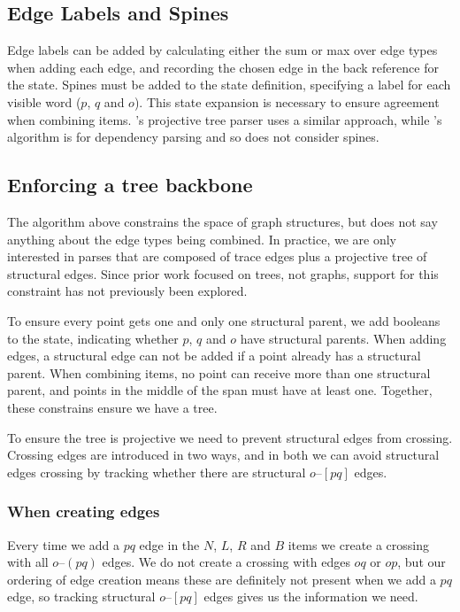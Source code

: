 \subsection{Edge Labels and Spines}\label{sec:labels}
Edge labels can be added by calculating either the sum or max over edge types when adding each edge, and recording the chosen edge in the back reference for the state.
Spines must be added to the state definition, specifying a label for each visible word ($p$, $q$ and $o$).
This state expansion is necessary to ensure agreement when combining items.
\textcite{cck}'s projective tree parser uses a similar approach, while \textcite{ec}'s algorithm is for dependency parsing and so does not consider spines.

\subsection{Enforcing a tree backbone}
The algorithm above constrains the space of graph structures, but does not say anything about the edge types being combined.
In practice, we are only interested in parses that are composed of trace edges plus a projective tree of structural edges.
Since prior work focused on trees, not graphs, support for this constraint has not previously been explored.

To ensure every point gets one and only one structural parent, we add booleans to the state, indicating whether $p$, $q$ and $o$ have structural parents.
When adding edges, a structural edge can not be added if a point already has a structural parent.
When combining items, no point can receive more than one structural parent, and points in the middle of the span must have at least one.
Together, these constrains ensure we have a tree.

To ensure the tree is projective we need to prevent structural edges from crossing.
Crossing edges are introduced in two ways, and in both we can avoid structural edges crossing by tracking whether there are structural $o$--$[pq]$ edges.

\subsubsection{When creating edges}
Every time we add a $pq$ edge in the $N$, $L$, $R$ and $B$ items we create a crossing with all $o$--$(pq)$ edges.
We do not create a crossing with edges $oq$ or $op$, but our ordering of edge creation means these are definitely not present when we add a $pq$ edge, so tracking structural $o$--$[pq]$ edges gives us the information we need.

